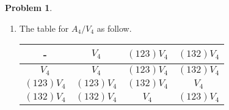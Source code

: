 \documentclass[a4paper, 12pt, fleqn]{article}
\theoremstyle{definition}
\newtheorem{prb}{Problem}
\begin{document}
\begin{prb}
\begin{enumerate}
        \item The table for $A_4 /V_4$ as follow.
        \begin{table}[h]
            \begin{tabular}{|c||c|c|c|}\hline
                - & $V_4$  & $(123)V_4$ & $(132)V_4$ \\ \hline  \hline
                $V_4$      & $V_4$      & $(123)V_4$ & $(132)V_4$ \\ \hline
                $(123)V_4$ & $(123)V_4$ & $(132)V_4$ & $V_4$ \\ \hline
                $(132)V_4$ & $(132)V_4$ & $V_4$      & $(123)V_4$ \\ \hline
            \end{tabular}
        \end{table}

    \end{enumerate}
\end{prb}
\end{document}
